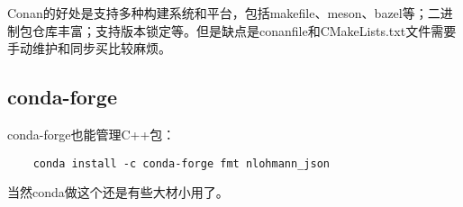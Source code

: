 \documentclass[../main]{subfiles}
\begin{document}
Conan的好处是支持多种构建系统和平台，包括makefile、meson、bazel等；二进制包仓库丰富；支持版本锁定等。但是缺点是conanfile和CMakeLists.txt文件需要手动维护和同步买比较麻烦。

\subsection{conda-forge}

conda-forge也能管理C++包：
\begin{lstlisting}
    conda install -c conda-forge fmt nlohmann_json
\end{lstlisting}
当然conda做这个还是有些大材小用了。
\end{document}
